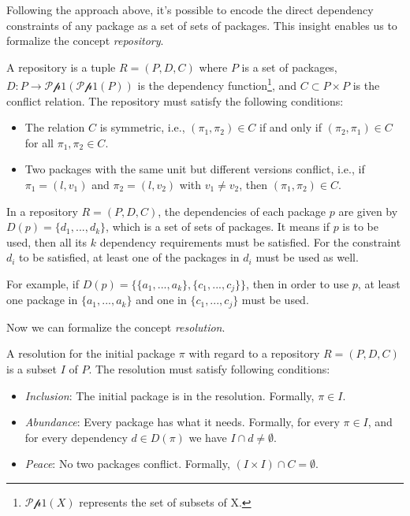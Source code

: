 Following the approach above, it's possible to encode the direct dependency constraints of any package as a set of sets of packages. This insight enables us to formalize the concept \emph{repository}\cite{mancinelli2006managing}.

\begin{definition}[Repository]
  A repository is a tuple $R = (P, D, C)$ where $P$ is a set of packages, $D : P \rightarrow \mathscr{P p 1}(\mathscr{P p 1}(P))$ is the dependency function\footnote{$\mathscr{P p 1}(X)$ represents the set of subsets of X.}, and $C \subset P \times P$ is the conflict relation. The repository must satisfy the following conditions:

  \begin{itemize}
  \item The relation $C$ is symmetric, i.e., $(\pi_1, \pi_2) \in C$ if and only if $(\pi_2, \pi_1) \in C$ for all $\pi_1, \pi_2 \in C$.
  \item Two packages with the same unit but different versions conflict, i.e., if $\pi_1 = (l, v_1)$ and $\pi_2 = (l, v_2)$ with $v_1 \neq v_2$, then $(\pi_1, \pi_2) \in C$.
  \end{itemize}
\end{definition}

In a repository $R = (P, D, C)$, the dependencies of each package $p$ are given by $D(p) = \{d_1, ..., d_k\}$, which is a set of sets of packages. It means if $p$ is to be used, then all its $k$ dependency requirements must be satisfied. For the constraint $d_i$ to be satisfied, at least one of the packages in $d_i$ must be used as well.

For example, if $D(p) = \{\{a_1, ..., a_k\}, \{c_1, ..., c_j\}\}$, then in order to use $p$, at least one package in $\{a_1, ..., a_k\}$ and one in $\{c_1, ..., c_j\}$ must be used.

Now we can formalize the concept \emph{resolution}.

\begin{definition}[Resolution]
  A resolution for the initial package $\pi$ with regard to a repository $R = (P, D, C)$ is a subset $I$ of $P$. The resolution must satisfy following conditions:

  \begin{itemize}
  \item \emph{Inclusion}: The initial package is in the resolution. Formally, $\pi \in I$.
  \item \emph{Abundance}: Every package has what it needs. Formally, for every $\pi \in I$, and for every dependency $d \in D(\pi)$ we have $I \cap d \neq \emptyset$.
  \item \emph{Peace}: No two packages conflict. Formally, $(I \times I) \cap C = \emptyset$.
  \end{itemize}
\end{definition}

